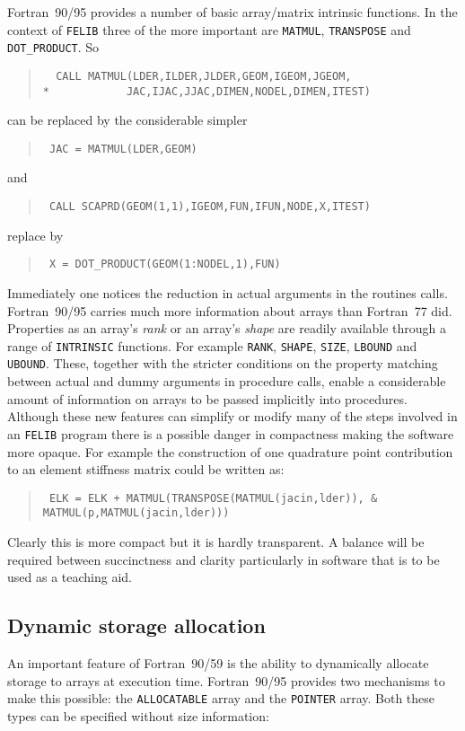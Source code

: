 \documentclass[a4paper,titlepage,11pt]{article}
\begin{document}
Fortran~90/95 provides a number of basic array/matrix intrinsic functions. In the
context of {\tt FELIB} three of the more important are {\tt MATMUL}, {\tt TRANSPOSE}
 and {\tt DOT\_PRODUCT}. So
\begin{quote}
\tt\source
{~}CALL MATMUL(LDER,ILDER,JLDER,GEOM,IGEOM,JGEOM,\\
{*~~~~~~~~~~~~}JAC,IJAC,JJAC,DIMEN,NODEL,DIMEN,ITEST)
\end{quote}
can be replaced by the considerable simpler
\begin{quote}
\tt\source
JAC = MATMUL(LDER,GEOM)
\end{quote}
and
\begin{quote}
\tt\source
CALL SCAPRD(GEOM(1,1),IGEOM,FUN,IFUN,NODE,X,ITEST)
\end{quote}
replace by
\begin{quote}
\tt\source
X = DOT\_PRODUCT(GEOM(1:NODEL,1),FUN)
\end{quote}
Immediately one notices the reduction in actual arguments in the routines calls.
Fortran~90/95 carries much more information about arrays than Fortran~77 did. Properties
as an array's {\it rank} or an array's {\it shape} are readily available through
a range of {\tt INTRINSIC} functions. For example {\tt RANK}, {\tt SHAPE}, {\tt SIZE},
{\tt LBOUND} and {\tt UBOUND}. These, together with the stricter conditions on the
property matching between actual and dummy arguments in procedure calls, enable a
considerable amount of information on arrays to be passed implicitly into procedures.
Although these new features can simplify or modify many of the steps involved in
an {\tt FELIB} program there is a possible danger in compactness making the
software more opaque. For example the construction of one quadrature point contribution
to an element stiffness matrix could be written as:
\begin{quote}
\tt\source
ELK = ELK + MATMUL(TRANSPOSE(MATMUL(jacin,lder)),   \&\\
\hspace*{30mm}MATMUL(p,MATMUL(jacin,lder)))
\end{quote}
Clearly this is more compact but it is hardly transparent. A balance will be required
between succinctness and clarity particularly in software that is to be used
as a teaching aid.
\subsection{Dynamic storage allocation}
An important feature of Fortran~90/59 is the ability to
dynamically allocate storage to arrays at execution time. Fortran~90/95
provides two mechanisms to make this possible: the {\tt ALLOCATABLE} array
and the {\tt POINTER} array. Both these types can be specified without
size information:
\end{document}
